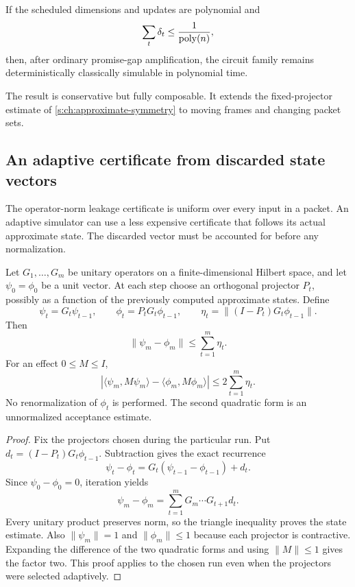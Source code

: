 \begin{corollary}
If the scheduled dimensions and updates are polynomial and
\[
\sum_t\delta_t\le\frac1{\operatorname{poly}(n)},
\]
then, after ordinary promise-gap amplification, the circuit family remains deterministically classically simulable in polynomial time.
\end{corollary}

The result is conservative but fully composable. It extends the fixed-projector estimate of \cref{s:ch:approximate-symmetry} to moving frames and changing packet sets.


\subsection{An adaptive certificate from discarded state vectors}
The operator-norm leakage certificate is uniform over every input in a packet. An adaptive simulator can use a less expensive certificate that follows its actual approximate state. The discarded vector must be accounted for before any normalization.

\begin{theorem}
\label{s:thm:adaptive-discarded-state}
Let $G_1,\ldots,G_m$ be unitary operators on a finite-dimensional Hilbert space, and let $\psi_0=\phi_0$ be a unit vector. At each step choose an orthogonal projector $P_t$, possibly as a function of the previously computed approximate states. Define
\[
\psi_t=G_t\psi_{t-1},\qquad
\phi_t=P_tG_t\phi_{t-1},\qquad
\eta_t=\|(I-P_t)G_t\phi_{t-1}\|.
\]
Then
\[
\|\psi_m-\phi_m\|\le\sum_{t=1}^m\eta_t.
\]
For an effect $0\le M\le I$,
\[
\left|\langle\psi_m,M\psi_m\rangle-\langle\phi_m,M\phi_m\rangle\right|
\le2\sum_{t=1}^m\eta_t.
\]
No renormalization of $\phi_t$ is performed. The second quadratic form is an unnormalized acceptance estimate.
\end{theorem}

\begin{proof}
Fix the projectors chosen during the particular run. Put $d_t=(I-P_t)G_t\phi_{t-1}$. Subtraction gives the exact recurrence
\[
\psi_t-\phi_t=G_t(\psi_{t-1}-\phi_{t-1})+d_t.
\]
Since $\psi_0-\phi_0=0$, iteration yields
\[
\psi_m-\phi_m=\sum_{t=1}^mG_m\cdots G_{t+1}d_t.
\]
Every unitary product preserves norm, so the triangle inequality proves the state estimate. Also $\|\psi_m\|=1$ and $\|\phi_m\|\le1$ because each projector is contractive. Expanding the difference of the two quadratic forms and using $\|M\|\le1$ gives the factor two. This proof applies to the chosen run even when the projectors were selected adaptively.
\end{proof}

